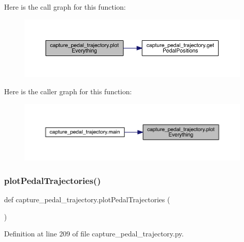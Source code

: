 Here is the call graph for this function\+:\nopagebreak
\begin{figure}[H]
\begin{center}
\leavevmode
\includegraphics[width=350pt]{namespacecapture__pedal__trajectory_a54694682225635fb5a735f159e9f059c_cgraph}
\end{center}
\end{figure}
Here is the caller graph for this function\+:\nopagebreak
\begin{figure}[H]
\begin{center}
\leavevmode
\includegraphics[width=350pt]{namespacecapture__pedal__trajectory_a54694682225635fb5a735f159e9f059c_icgraph}
\end{center}
\end{figure}
\mbox{\label{namespacecapture__pedal__trajectory_ab92d9c5ee601a8497311ab922392e027}} 
\subsubsection{\texorpdfstring{plotPedalTrajectories()}{plotPedalTrajectories()}}
{\footnotesize\ttfamily def capture\+\_\+pedal\+\_\+trajectory.\+plot\+Pedal\+Trajectories (\begin{DoxyParamCaption}{ }\end{DoxyParamCaption})}



Definition at line 209 of file capture\+\_\+pedal\+\_\+trajectory.\+py.


